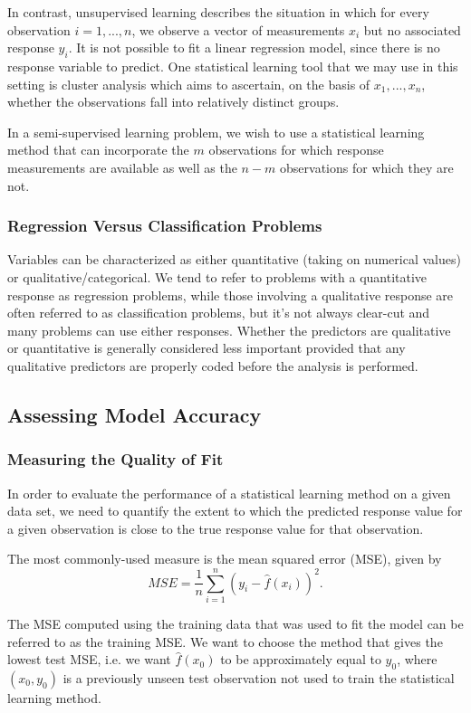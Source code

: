 \documentclass{article}
\begin{document}
In contrast, unsupervised learning describes the situation in which for every observation $i = 1,...,n$, we observe a vector of measurements $x_i$ but no associated response $y_i$. It is not possible to fit a linear regression model, since there is no response variable to predict.  One statistical learning tool that we may use in this setting is cluster analysis which aims to ascertain, on the basis of $x_1,..., x_n$, whether the observations fall into relatively distinct groups.

In a semi-supervised learning problem, we wish to use a statistical learning method that can incorporate the $m$ observations for which response measurements are available as well as the $n - m$ observations for which they are not. 

\subsubsection{Regression Versus Classification Problems}
Variables can be characterized as either quantitative (taking on numerical values) or qualitative/categorical. We tend to refer to problems with a quantitative response as regression problems, while those involving a qualitative response are often referred to as classification problems, but it's not always clear-cut and many problems can use either responses. Whether the predictors are qualitative or quantitative is generally considered less important provided that any qualitative predictors are properly coded before the analysis is
performed.

\subsection{Assessing Model Accuracy}

\subsubsection{Measuring the Quality of Fit}
In order to evaluate the performance of a statistical learning method on a given data set, we need to quantify the extent to which the predicted response value for a given observation is close to the true response value for that observation.

The most commonly-used measure is the mean squared error (MSE), given by
\[
    MSE = \frac{1}{n} \sum_{i=1}^n (y_i - \hat f(x_i))^2.
\]

The MSE computed using the training data that was used to fit the model can be referred to as the training
MSE. We want to choose the method that gives
the lowest test MSE, i.e. we want $\hat f(x_0)$ to be approximately equal to $y_0$, where $(x_0, y_0)$ is a previously unseen test observation not used to train the statistical learning method.
\end{document}
